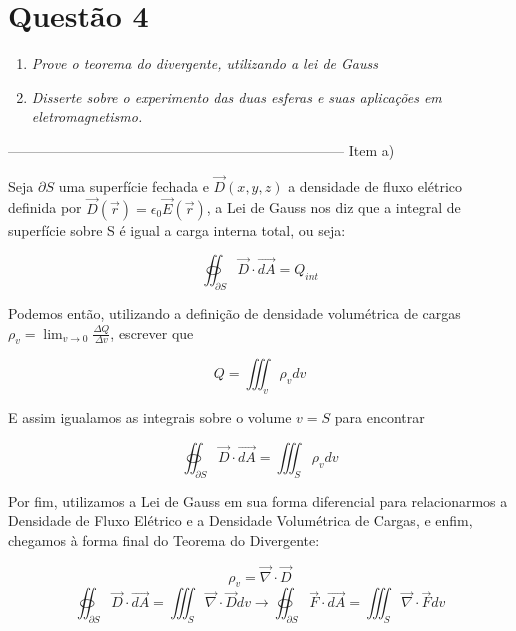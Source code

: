 \documentclass[journal,comsoc]{IEEEtran}
\begin{document}

\section{Questão 4}
    \begin{enumerate}
    	\item{\textit{Prove o teorema do divergente, utilizando a lei de Gauss}}
        \item{\textit{Disserte sobre o experimento das duas esferas e suas aplicações em eletromagnetismo.}}
        \end{enumerate}
\hfill

------------------------------------------------------------------------
Item a)
\par Seja $\partial S$ uma superfície fechada e $\vec{D}(x,y,z)$ a densidade de fluxo elétrico definida por $\vec{D}(\vec{r})=\epsilon_{0}\vec{E}(\vec{r})$, a Lei de Gauss nos diz que a integral de superfície sobre S é igual a carga interna total, ou seja: 

\begin{equation}
\oiint_{\partial S} \vec{D}\cdot\vec{dA} = Q_{int}
\end{equation}

\par Podemos então, utilizando a definição de densidade volumétrica de cargas $\rho_v = \lim_{v \to 0}\frac{\Delta Q}{\Delta v}$, escrever que

\begin{equation}
	Q = \iiint_v \rho_v dv
\end{equation}

\par E assim igualamos as integrais sobre o volume $v=S$ para encontrar

\begin{equation}
	\oiint_{\partial S} \vec{D}\cdot\vec{dA} = \iiint_S \rho_v dv
\end{equation}

\par Por fim, utilizamos a Lei de Gauss em sua forma diferencial para relacionarmos a Densidade de Fluxo Elétrico e a Densidade Volumétrica de Cargas, e enfim, chegamos à forma final do Teorema do Divergente:

\begin{equation}
	\rho_{v} = \vec{\nabla}\cdot\vec{D}
\end{equation}
\begin{equation}
	\oiint_{\partial S} \vec{D}\cdot\vec{dA} = \iiint_S \vec{\nabla}\cdot\vec{D} dv 
\rightarrow
\oiint_{\partial S} \vec{F}\cdot\vec{dA} = \iiint_S \vec{\nabla}\cdot\vec{F} dv
\end{equation}
\end{document}
